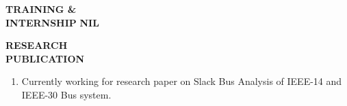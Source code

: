 \documentclass{article}
\begin{document}
	 \begin{flushleft} 
	 	\vspace{0.4in}
	 	\textbf{TRAINING \& \\ INTERNSHIP}
	 	\hspace{1.5cm} \textbf{NIL}
	 \end{flushleft}
	 
	  \begin{flushleft} 
	  	\vspace{0.4in}
	  	\textbf{RESEARCH \\ PUBLICATION}
	  	\begin{enumerate}
	  		\vspace{-0.45in}
	  		\addtolength{\itemindent}{1.359in}
	  		\item  Currently working for research paper on Slack Bus Analysis of IEEE-14 and\\\hspace{3.4cm} IEEE-30 Bus system.
	  	\end{enumerate}
	  \end{flushleft}
	  
	  
	
\end{document}
